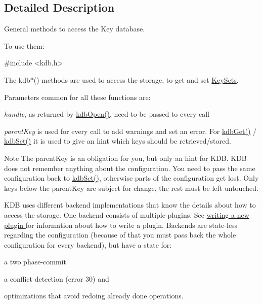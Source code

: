 \subsection{Detailed Description}
General methods to access the Key database. 

To use them\+: 
\begin{DoxyCode}
\textcolor{preprocessor}{#include <kdb.h>}
\end{DoxyCode}


The kdb$\ast$() methods are used to access the storage, to get and set \hyperlink{group__keyset}{Key\+Sets}.

Parameters common for all these functions are\+:


\begin{DoxyItemize}
\item {\itshape handle}, as returned by \hyperlink{group__kdb_ga6808defe5870f328dd17910aacbdc6ca}{kdb\+Open()}, need to be passed to every call
\item {\itshape parent\+Key} is used for every call to add warnings and set an error. For \hyperlink{group__kdb_ga28e385fd9cb7ccfe0b2f1ed2f62453a1}{kdb\+Get()} / \hyperlink{group__kdb_ga11436b058408f83d303ca5e996832bcf}{kdb\+Set()} it is used to give an hint which keys should be retrieved/stored.
\end{DoxyItemize}

\begin{DoxyNote}{Note}
The parent\+Key is an obligation for you, but only an hint for K\+DB. K\+DB does not remember anything about the configuration. You need to pass the same configuration back to \hyperlink{group__kdb_ga11436b058408f83d303ca5e996832bcf}{kdb\+Set()}, otherwise parts of the configuration get lost. Only keys below the parent\+Key are subject for change, the rest must be left untouched.
\end{DoxyNote}
K\+DB uses different backend implementations that know the details about how to access the storage. One backend consists of multiple plugins. See \hyperlink{group__plugin}{writing a new plugin } for information about how to write a plugin. Backends are state-\/less regarding the configuration (because of that you must pass back the whole configuration for every backend), but have a state for\+:


\begin{DoxyItemize}
\item a two phase-\/commit
\item a conflict detection (error 30) and
\item optimizations that avoid redoing already done operations.
\end{DoxyItemize}


